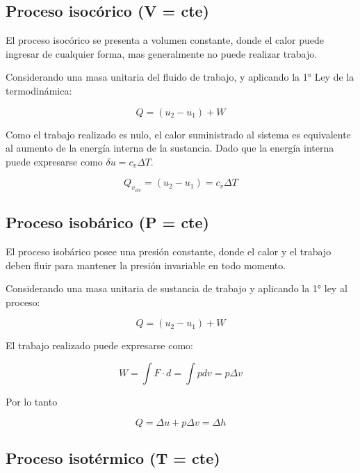 \subsection{Proceso isocórico (V = cte)}

El proceso isocórico se presenta a volumen constante, donde el calor puede ingresar de cualquier forma, mas generalmente no puede realizar trabajo. 

Considerando una masa unitaria del fluido de trabajo, y aplicando la 1° Ley de la termodinámica:

\begin{equation*}
    Q = \left(u_2 - u_1\right) + W
\end{equation*}

Como el trabajo realizado es nulo, el calor suministrado al sistema es equivalente al aumento de la energía interna de la sustancia. Dado que la energía interna puede expresarse como $\delta u = c_v \Delta T$.

\begin{equation*}
    Q_{v_{cte}} = \left(u_2 - u_1\right) = c_v \Delta T
\end{equation*}

\subsection{Proceso isobárico (P = cte)}

El proceso isobárico posee una presión constante, donde el calor y el trabajo deben fluir para mantener la presión invariable en todo momento.

Considerando una masa unitaria de sustancia de trabajo y aplicando la 1° ley al proceso:

\begin{equation*}
    Q = \left(u_2 - u_1\right) + W 
\end{equation*}

El trabajo realizado puede expresarse como:

\begin{equation*}
    W = \int F \cdot d = \int p dv = p \Delta v   
\end{equation*}

Por lo tanto

\begin{equation*}
    Q = \Delta u + p \Delta v = \Delta h
\end{equation*}

\subsection{Proceso isotérmico (T = cte)}

